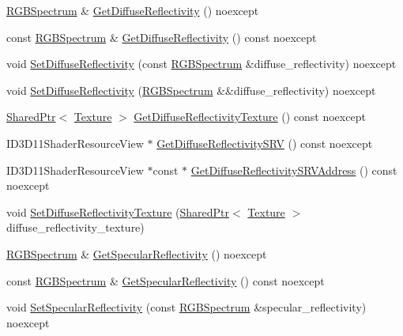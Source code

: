 \begin{DoxyCompactItemize}
\item 
\hyperlink{structmage_1_1_r_g_b_spectrum}{R\+G\+B\+Spectrum} \& \hyperlink{structmage_1_1_material_afb37e1cd37df82b6607a4e5998e58ea8}{Get\+Diffuse\+Reflectivity} () noexcept
\item 
const \hyperlink{structmage_1_1_r_g_b_spectrum}{R\+G\+B\+Spectrum} \& \hyperlink{structmage_1_1_material_a046b0d8eece74bd68538fefd03c1f294}{Get\+Diffuse\+Reflectivity} () const noexcept
\item 
void \hyperlink{structmage_1_1_material_aef82ef4eba08eabc31989144316a57c6}{Set\+Diffuse\+Reflectivity} (const \hyperlink{structmage_1_1_r_g_b_spectrum}{R\+G\+B\+Spectrum} \&diffuse\+\_\+reflectivity) noexcept
\item 
void \hyperlink{structmage_1_1_material_a83281d9408fcdc3c6de6804f31a527b3}{Set\+Diffuse\+Reflectivity} (\hyperlink{structmage_1_1_r_g_b_spectrum}{R\+G\+B\+Spectrum} \&\&diffuse\+\_\+reflectivity) noexcept
\item 
\hyperlink{namespacemage_a1e01ae66713838a7a67d30e44c67703e}{Shared\+Ptr}$<$ \hyperlink{classmage_1_1_texture}{Texture} $>$ \hyperlink{structmage_1_1_material_a3b4de7dc988c91eb3ce7ea715d98b758}{Get\+Diffuse\+Reflectivity\+Texture} () const noexcept
\item 
I\+D3\+D11\+Shader\+Resource\+View $\ast$ \hyperlink{structmage_1_1_material_a20c4db65d5fb89178c0f6b6db2f87cda}{Get\+Diffuse\+Reflectivity\+S\+RV} () const noexcept
\item 
I\+D3\+D11\+Shader\+Resource\+View $\ast$const  $\ast$ \hyperlink{structmage_1_1_material_a655a7349f6023b81e8d396abe06ed6ac}{Get\+Diffuse\+Reflectivity\+S\+R\+V\+Address} () const noexcept
\item 
void \hyperlink{structmage_1_1_material_a32e02c92dfd73db1a8a809a45546dc87}{Set\+Diffuse\+Reflectivity\+Texture} (\hyperlink{namespacemage_a1e01ae66713838a7a67d30e44c67703e}{Shared\+Ptr}$<$ \hyperlink{classmage_1_1_texture}{Texture} $>$ diffuse\+\_\+reflectivity\+\_\+texture)
\item 
\hyperlink{structmage_1_1_r_g_b_spectrum}{R\+G\+B\+Spectrum} \& \hyperlink{structmage_1_1_material_ad5fde8d972471fc99b72a4fc969883b1}{Get\+Specular\+Reflectivity} () noexcept
\item 
const \hyperlink{structmage_1_1_r_g_b_spectrum}{R\+G\+B\+Spectrum} \& \hyperlink{structmage_1_1_material_a81005b5094b99b9a8d7f16bedd195718}{Get\+Specular\+Reflectivity} () const noexcept
\item 
void \hyperlink{structmage_1_1_material_ac615e33c8e17149345488fed5c16dc7b}{Set\+Specular\+Reflectivity} (const \hyperlink{structmage_1_1_r_g_b_spectrum}{R\+G\+B\+Spectrum} \&specular\+\_\+reflectivity) noexcept

\end{DoxyCompactItemize}
